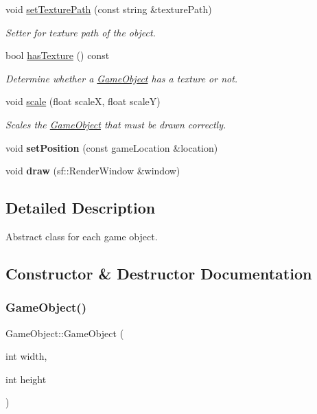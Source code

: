 \begin{DoxyCompactItemize}
void \hyperlink{classGameObject_a0d9759f01e8098149ce3e69cb8878534}{set\+Texture\+Path} (const string \&texture\+Path)
\begin{DoxyCompactList}\small\item\em Setter for texture path of the object. \end{DoxyCompactList}\item 
bool \hyperlink{classGameObject_a70e86ba6707ed1b23bb37d1336cd41df}{has\+Texture} () const
\begin{DoxyCompactList}\small\item\em Determine whether a \hyperlink{classGameObject}{Game\+Object} has a texture or not. \end{DoxyCompactList}\item 
void \hyperlink{classGameObject_a47616d924a30ae7db22387234c0381a1}{scale} (float scaleX, float scaleY)
\begin{DoxyCompactList}\small\item\em Scales the \hyperlink{classGameObject}{Game\+Object} that must be drawn correctly. \end{DoxyCompactList}\item 
\mbox{\label{classGameObject_a3db3881d7943862b683cda0c08439a63}} 
void {\bfseries set\+Position} (const game\+Location \&location)
\item 
\mbox{\label{classGameObject_abf4de46e52c8f23d18d51bc29744b136}} 
void {\bfseries draw} (sf\+::\+Render\+Window \&window)
\end{DoxyCompactItemize}


\subsection{Detailed Description}
Abstract class for each game object. 

\subsection{Constructor \& Destructor Documentation}
\mbox{\label{classGameObject_af1571c09945131e1d791dfbbe56d69df}} 
\subsubsection{\texorpdfstring{Game\+Object()}{GameObject()}\hspace{0.1cm}{\footnotesize\ttfamily [1/2]}}
{\footnotesize\ttfamily Game\+Object\+::\+Game\+Object (\begin{DoxyParamCaption}\item[{int}]{width,  }\item[{int}]{height }\end{DoxyParamCaption})}



